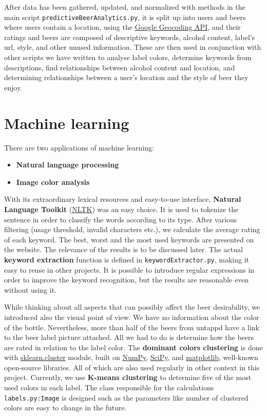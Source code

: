 \documentclass[10pt]{IEEEtran}
\begin{document}
After data has been gathered, updated, and normalized with methods in the main script \texttt{predictiveBeerAnalytics.py}, it is split up into users and beers where users contain a location, using the \href{https://developers.google.com/maps/documentation/geocoding/}{Google Geocoding API}, and their ratings and beers are composed of descriptive keywords, alcohol content, label's url, style, and other unused information. These are then used in conjunction with other scripts we have written to analyse label colors, determine keywords from descriptions, find relationships between alcohol content and location, and  determining relationships between a user's location and the style of beer they enjoy.

\section{Machine learning}
There are two applications of machine learning: 

\hspace{0.3 cm}
\begin{itemize}
  \item \textbf{Natural language processing}
  \item \textbf{Image color analysis}
\end{itemize}
\hspace{0.3 cm}

With its extraordinary lexical resources and easy-to-use interface, \textbf{Natural Language Toolkit} (\href{http://www.nltk.org/}{NLTK}) was an easy choice. It is used to tokenize the sentence in order to classify the words according to its type. After various filtering (usage threshold, invalid characters etc.), we calculate the average rating of each keyword. The best, worst and the most used keywords are presented on the website. The relevance of the results is to be discussed later. The actual \textbf{keyword extraction} function is defined in \texttt{keywordExtractor.py}, making it easy to reuse in other projects. It is possible to introduce regular expressions in order to improve the keyword recognition, but the results are reasonable even without using it.

While thinking about all aspects that can possibly affect the beer desirability, we introduced also the visual point of view. We have no information about the color of the bottle. Nevertheless, more than half of the beers from untappd have a link to the beer label picture attached. All we had to do is determine how the beers are rated in relation to the label color. The \textbf{dominant colors clustering} is done with \href{http://scikit-learn.org/stable/modules/classes.html#module-sklearn.cluster}{sklearn.cluster} module, built on \href{http://www.numpy.org/}{NumPy}, \href{http://scipy.org/}{SciPy}, and \href{http://matplotlib.org/}{matplotlib}, well-known open-source libraries. All of which are also used regularly in other context in this project. Currently, we use \textbf{K-means clustering} to determine five of the most used colors in each label. The class responsible for the calculations \texttt{labels.py:Image} is designed such as the parameters like number of clustered colors are easy to change in the future.
\end{document}
